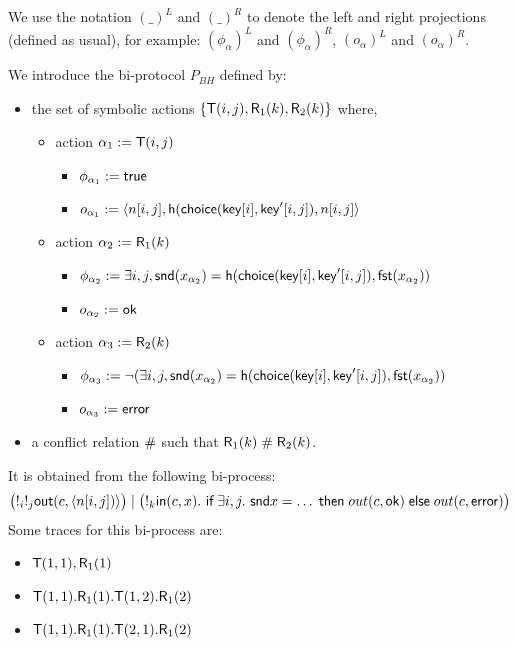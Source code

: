 We use the notation $(\_)^L$ and $(\_)^R$ to denote the left and right projections
(defined as usual), for example: $(\phi_{\alpha})^L$ and $(\phi_{\alpha})^R$,
$(o_{\alpha})^L$ and $(o_{\alpha})^R$.


\begin{example}
  \label{ex:basic-hash-bi-process}
  We introduce the bi-protocol $P_{BH}$ defined by:
  \begin{itemize}
    \item the set of symbolic actions $\{\textsf{T}(i,j),\textsf{R}_1(k),\textsf{R}_2(k)\}$ where,
    \begin{itemize}
      \item action $\alpha_1 := \textsf{T}(i,j)$
        \begin{itemize}
          \item $\phi_{\alpha_1} := \textsf{true}$
          \item $o_{\alpha_1} := \langle n[i,j], \mathsf{h}(\mathsf{choice}(\mathsf{key}[i],\mathsf{key}'[i,j]),n[i,j] \rangle$
        \end{itemize}
      \item action $\alpha_2 := \textsf{R}_1(k)$
        \begin{itemize}
          \item $\phi_{\alpha_2} := \exists i,j, \mathsf{snd}(x_{\alpha_2}) =
            \mathsf{h}(\mathsf{choice}(\mathsf{key}[i],\mathsf{key}'[i,j]),\mathsf{fst}(x_{\alpha_2}))$
          \item $o_{\alpha_2} := \mathsf{ok}$
        \end{itemize}
      \item action $\alpha_3 := \textsf{R}_2(k)$
        \begin{itemize}
          \item $\phi_{\alpha_3} := \neg (\exists i,j, \mathsf{snd}(x_{\alpha_2}) =  \mathsf{h}(\mathsf{choice}(\mathsf{key}[i],\mathsf{key}'[i,j]),\mathsf{fst}(x_{\alpha_2}))$
          \item $o_{\alpha_3} := \mathsf{error}$
        \end{itemize}
    \end{itemize}
    \item a conflict relation $\mathrel{\#}$ such that $\textsf{R}_1(k)\mathrel{\#}\textsf{R}_2(k)$.
  \end{itemize}
  It is obtained from the following bi-process:
  $$\bigl(!_i !_j \textsf{out}(c,\langle  n[i,j]) \rangle\bigr) \mid
   \bigl(!_k \textsf{in}(c,x).~ \textsf{if}\; \exists i,j.~ \mathsf{snd}{x} = \ldots \;\textsf{then}\;
    out(c,\mathsf{ok}) \;\textsf{else}\; out(c,\mathsf{error})\bigr)$$
  Some traces for this bi-process are:
  \begin{itemize}
    \item $\textsf{T}(1,1),\textsf{R}_1(1)$
    \item $\textsf{T}(1,1).\textsf{R}_1(1).\textsf{T}(1,2).\textsf{R}_1(2)$
    \item $\textsf{T}(1,1).\textsf{R}_1(1).\textsf{T}(2,1).\textsf{R}_1(2)$
  \end{itemize}
\end{example}

